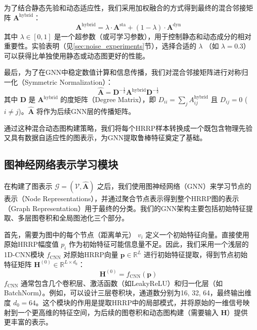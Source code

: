 为了结合静态先验和动态适应性，我们采用加权融合的方式得到最终的混合邻接矩阵 $\mathbf{A}^{\text{hybrid}}$：
\begin{equation}
    \mathbf{A}^{\text{hybrid}} = \lambda \cdot \mathbf{A}^{\text{sta}} + (1-\lambda) \cdot \mathbf{A}^{\text{dyn}}
    \label{eq:hybrid_adjacency}
\end{equation}
其中 $\lambda \in [0,1]$ 是一个超参数（或可学习参数），用于控制静态和动态成分的相对重要性。实验表明（见\ref{sec:noise_experiments}节），选择合适的 $\lambda$ （如 $\lambda=0.3$）可以获得比单独使用静态或动态图更好的性能。

最后，为了在GNN中稳定数值计算和信息传播，我们对混合邻接矩阵进行对称归一化（Symmetric Normalization）：
\begin{equation}
    \hat{\mathbf{A}} = \mathbf{D}^{-\frac{1}{2}} \mathbf{A}^{\text{hybrid}} \mathbf{D}^{-\frac{1}{2}}
    \label{eq:normalized_adjacency}
\end{equation}
其中 $\mathbf{D}$ 是 $\mathbf{A}^{\text{hybrid}}$ 的度矩阵（Degree Matrix），即 $D_{ii} = \sum_j A^{\text{hybrid}}_{ij}$ 且 $D_{ij}=0$ ($i \neq j$)。$\hat{\mathbf{A}}$ 将作为后续GNN层的传播矩阵。

通过这种混合动态图构建策略，我们将每个HRRP样本转换成一个既包含物理先验又具有数据自适应性的图表示，为GNN提取鲁棒特征奠定了基础。

\subsection{图神经网络表示学习模块}
\label{subsec:gnn_module}

在构建了图表示 $\mathcal{G} = (\mathcal{V}, \hat{\mathbf{A}})$ 之后，我们使用图神经网络（GNN）来学习节点的表示（Node Representations），并通过聚合节点表示得到整个HRRP图的表示（Graph Representation）用于最终的分类。我们的GNN架构主要包括初始特征提取、多层图卷积和全局图池化三个部分。

首先，需要为图中的每个节点（距离单元） $v_i$ 定义一个初始特征向量。直接使用原始HRRP幅度值 $p_i$ 作为初始特征可能信息量不足。因此，我们采用一个浅层的1D-CNN模块 $f_{\text{CNN}}$ 对原始HRRP向量 $\mathbf{p} \in \mathbb{R}^{L}$ 进行初始特征提取，得到节点初始特征矩阵 $\mathbf{H}^{(0)} \in \mathbb{R}^{L \times d_0}$：
\begin{equation}
    \mathbf{H}^{(0)} = f_{\text{CNN}}(\mathbf{p})
    \label{eq:initial_features}
\end{equation}
$f_{\text{CNN}}$ 通常包含几个卷积层、激活函数（如LeakyReLU）和归一化层（如BatchNorm）。例如，可以设计三层卷积块，通道数分别为16, 32, 64，最终输出维度 $d_0=64$。这个模块的作用是提取HRRP中的局部模式，并将原始的一维信号映射到一个更高维的特征空间，为后续的图卷积和动态图构建（需要输入 $\mathbf{H}$）提供更丰富的表示。

